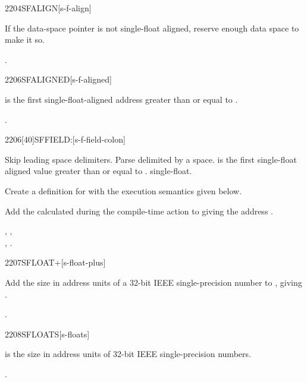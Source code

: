 \begin{worddef}{2204}{SFALIGN}[s-f-align]
\item \stack{}{}

	If the data-space pointer is not single-float aligned, reserve
	enough data space to make it so.

\see {}.
\end{worddef}


\begin{worddef}{2206}{SFALIGNED}[s-f-aligned]
\item {}

	 is the first single-float-aligned address greater
	than or equal to .

\see {}.
\end{worddef}


\begin{worddef}{2206}[40]{SFFIELD:}[s-f-field-colon]
\item {}

	Skip leading space delimiters. Parse  delimited by
	a space.  is the first single-float aligned value
	greater than or equal to .  
	single-float.

	Create a definition for  with the execution semantics
	given below.

\execute[name]

	Add the  calculated during the compile-time action to
	 giving the address .

\see {},
	, \\
	,
	.
\end{worddef}


\begin{worddef}{2207}{SFLOAT+}[s-float-plus]
\item {}

	Add the size in address units of a 32-bit IEEE single-precision
	number to , giving .

\see {}.
\end{worddef}


\begin{worddef}{2208}{SFLOATS}[s-floats]
\item {}

	 is the size in address units of  32-bit IEEE
	single-precision numbers.

\see {}.
\end{worddef}
